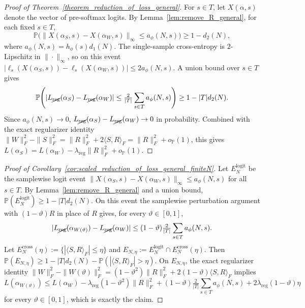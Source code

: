 \documentclass[11pt]{article}
\theoremstyle{plain}
\theoremstyle{definition}
\theoremstyle{remark}
\newcommand{\PP}{\mathbb{P}}
\newcommand{\1}{\mathbf{1}}
\begin{document}
\begin{proof}[Proof of Theorem~\ref{theorem_reduction_of_loss_general}]
For \(s\in T\), let \(X(\alpha,s)\) denote the vector of pre-softmax logits. By Lemma~\ref{lem:remove_R_general}, for each fixed \(s\in T\),
\[
\PP\big(\|X(\alpha_S,s)-X(\alpha_W,s)\|_\infty\le a_\phi(N,s)\big)\ge 1-d_2(N),
\]
where \(a_\phi(N,s)=h_\phi(s)d_1(N)\). The single-sample cross-entropy is \(2\)-Lipschitz in \(\|\cdot\|_\infty\), so on this event \(|\ell_s(X(\alpha_S,s))-\ell_s(X(\alpha_W,s))|\le 2a_\phi(N,s)\). A union bound over \(s\in T\) gives
\[
\PP\!\left(|L_{\cancel{\mathrm{reg}}}(\alpha_S)-L_{\cancel{\mathrm{reg}}}(\alpha_W)|\le\tfrac{2}{|T|}\sum_{s\in T}a_\phi(N,s)\right)\ge 1-|T|d_2(N).
\]
Since \(a_\phi(N,s)\to0\), \(L_{\cancel{\mathrm{reg}}}(\alpha_S)-L_{\cancel{\mathrm{reg}}}(\alpha_W)\to0\) in probability. Combined with the exact regularizer identity \(\|W\|_F^2-\|S\|_F^2=\|R\|_F^2+2\langle S,R\rangle_F=\|R\|_F^2+o_{\PP}(1)\), this gives
\(
L(\alpha_S)=L(\alpha_W)-\lambda_{\mathrm{reg}}\|R\|_F^2+o_{\PP}(1).
\)
\end{proof}

\begin{proof}[Proof of Corollary~\ref{cor:scaled_reduction_of_loss_general_finiteN}]
Let \(E_N^{\mathrm{logit}}\) be the samplewise logit event \(\|X(\alpha_S,s)-X(\alpha_W,s)\|_\infty\le a_\phi(N,s)\) for all \(s\in T\). By Lemma~\ref{lem:remove_R_general} and a union bound, \(\PP(E_N^{\mathrm{logit}})\ge1-|T|d_2(N)\). On this event the samplewise perturbation argument with \((1-\vartheta)R\) in place of \(R\) gives, for every \(\vartheta\in[0,1]\),
\[
|L_{\cancel{\mathrm{reg}}}(\alpha_{W(\vartheta)})-L_{\cancel{\mathrm{reg}}}(\alpha_W)|\le (1-\vartheta)\tfrac{2}{|T|}\sum_{s\in T}a_\phi(N,s).
\]
Let \(E_N^{\mathrm{cross}}(\eta):=\{|\langle S,R\rangle_F|\le\eta\}\) and \(E_{N,\eta}:=E_N^{\mathrm{logit}}\cap E_N^{\mathrm{cross}}(\eta)\). Then \(\PP(E_{N,\eta})\ge 1-|T|d_2(N)-\PP(|\langle S,R\rangle_F|>\eta)\). On \(E_{N,\eta}\), the exact regularizer identity \(\|W\|_F^2-\|W(\vartheta)\|_F^2=(1-\vartheta^2)\|R\|_F^2+2(1-\vartheta)\langle S,R\rangle_F\) implies
\[
L(\alpha_{W(\vartheta)})\le L(\alpha_W)-\lambda_{\mathrm{reg}}(1-\vartheta^2)\|R\|_F^2+(1-\vartheta)\tfrac{2}{|T|}\sum_{s\in T}a_\phi(N,s)+2\lambda_{\mathrm{reg}}(1-\vartheta)\eta
\]
for every \(\vartheta\in[0,1]\), which is exactly the claim.
\end{proof}
\end{document}
